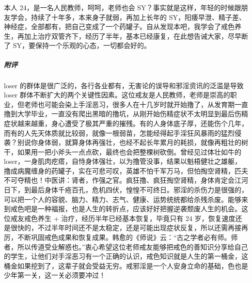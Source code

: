 \begin{case}
    本人 24，是一名人民教师，呵呵，老师也会 SY？事实就是这样，年轻的时候跟朋友学会，持续了十年多，本来身子就弱，再加上长年的 SY，阳痿早泄、精子差、神经症，全部都有，把自己变成了一个药罐子。自从发现本吧，我学会了戒色养生，再加上治疗双管齐下，经历了半年，基本已经康复，在此想告诫大家，尽早断了 SY，要保持一个乐观的心态，一切都会好的。
    \subparagraph{附评} loser 的群体是很广泛的，各行各业都有，无害论的误导和邪淫资讯的泛滥是导致 loser 群体不断扩大的两个关键性因素。这位戒友是人民教师，老师是崇高的职业，但老师也可能会染上手淫恶习，很多人在十几岁时就开始撸了，从发育期一直撸到大学毕业，一直没有爬出黑暗的撸坑，从刚开始伤精症状不太明显到最后伤精症状越来越重，身心遭受了极其严重的摧残。有的人身体底子厚，还能伤个几年，而有的人先天体质就比较弱，就像一根弱苗，怎能经得起手淫狂风暴雨的猛烈侵袭？别说你身体弱，就算身体再强壮，也经不起长年累月的耗损，就像再粗壮的树干，如果用一把小斧头一点点砍，最终也会把整棵树砍倒。曾经见过体壮如牛的 loser，一身肌肉疙瘩，自恃身体强壮，以为撸管没事，结果以魁梧健壮之雄躯，撸成病魔缠身的药罐子，实在可悲可叹，英雄不怕千军万马，但怕掏空肾精，匹夫不可夺精也！中医讲：肾者，作强之官。疯狂撸、疯狂掏空肾精，身体肯定会江河日下，到最后身体千疮百孔，危机四伏，惶惶不可终日。邪淫的杀伤力是很强的，可以把一个人的容貌、脑力、精力、志气、健康、运势统统都给杀残杀废。能够来到戒色吧是一种福报，也是人生的转折点，应该好好把握逆袭颓废人生的机会。这位戒友戒色养生 + 治疗，经历半年已经基本恢复，毕竟只有 24 岁，恢复速度还是很快的，不过半年时间还不是太稳定，还是可能出现症状反复，所以还需再接再厉，不断巩固戒色成果和恢复成果。韩愈的《师说》云：“古之学者必有师。师者，所以传道受业解惑也。”衷心希望这位老师戒友能够把戒色的善知识分享给自己的学生，让他们对手淫恶习有一个正确的认识，戒色知识就是人生的第一桶金，这桶金如果挖到了，这辈子就会受益无穷。戒邪淫是一个人安身立命的基础，色也是少年第一关，这一关必须要冲过！
\end{case}

